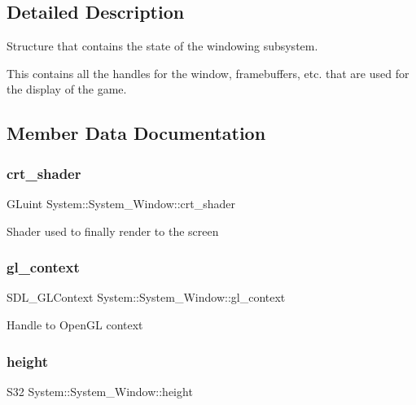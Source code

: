 \subsection{Detailed Description}
Structure that contains the state of the windowing subsystem. 

This contains all the handles for the window, framebuffers, etc. that are used for the display of the game. 

\subsection{Member Data Documentation}
\mbox{\label{structSystem_1_1System__Window_a66199a381d344b5e4fa30a8096688db5}} 
\subsubsection{\texorpdfstring{crt\_shader}{crt\_shader}}
{\footnotesize\ttfamily G\+Luint System\+::\+System\+\_\+\+Window\+::crt\+\_\+shader}

Shader used to finally render to the screen \mbox{\label{structSystem_1_1System__Window_a4c7a2e74ca760738cf797ada527e93b0}} 
\subsubsection{\texorpdfstring{gl\_context}{gl\_context}}
{\footnotesize\ttfamily S\+D\+L\+\_\+\+G\+L\+Context System\+::\+System\+\_\+\+Window\+::gl\+\_\+context}

Handle to Open\+GL context \mbox{\label{structSystem_1_1System__Window_a56dd8dbf992cd3454c0f0d29ec839f8e}} 
\subsubsection{\texorpdfstring{height}{height}}
{\footnotesize\ttfamily S32 System\+::\+System\+\_\+\+Window\+::height}

